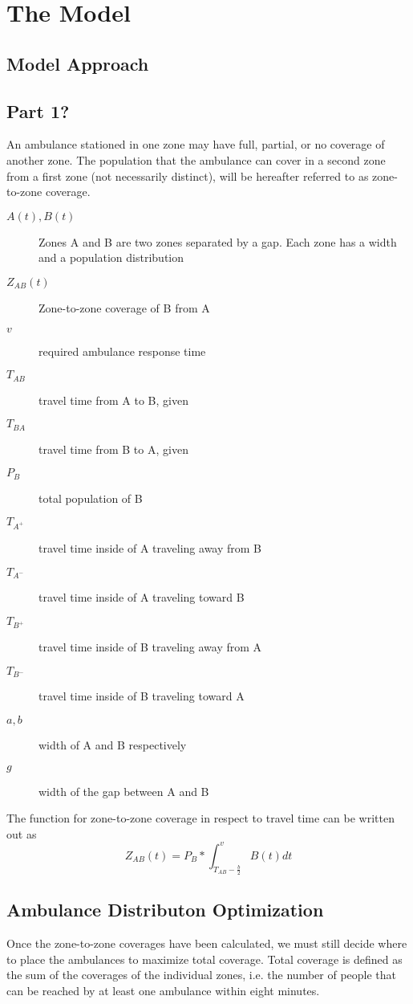 \documentclass[notitlepage, 12pt]{article}
\begin{document}
\section{The Model}

\subsection{Model Approach}

\subsection{Part 1?}
An ambulance stationed in one zone may have full, partial, or no coverage of another zone. The population
that the ambulance can cover in a second zone from a first zone (not necessarily distinct), will be hereafter referred to as
zone-to-zone coverage.
\begin{description}
    \item[$A(t), B(t)$] Zones A and B are two zones separated by a gap. Each zone has a width and a population distribution
    \item[$Z_{AB}(t)$] Zone-to-zone coverage of  B from  A
    \item[$v$] required ambulance response time
    \item[$T_{AB}$] travel time from A to B, given
    \item[$T_{BA}$] travel time from B to A, given
    \item[$P_B$] total population of B
    \item[$T_{A^+}$] travel time inside of A traveling away from B
    \item[$T_{A^-}$] travel time inside of A traveling toward B
    \item[$T_{B^+}$] travel time inside of B traveling away from A
    \item[$T_{B^-}$] travel time inside of B traveling toward A
    \item[$a, b$] width of A and B respectively
    \item[$g$] width of the gap between A and B
\end{description}

The function for zone-to-zone coverage in respect to travel time can be written out as 
$$Z_{AB}(t) = P_B * \int^v_{T_{AB} - \frac{b}{2}} B(t) dt$$


\subsection{Ambulance Distributon Optimization}
Once the zone-to-zone coverages have been calculated, we must still decide where to place
the ambulances to maximize total coverage. Total coverage is defined as the sum of the coverages
of the individual zones, i.e. the number of people that can be reached by at least one ambulance
within eight minutes.
\end{document}
